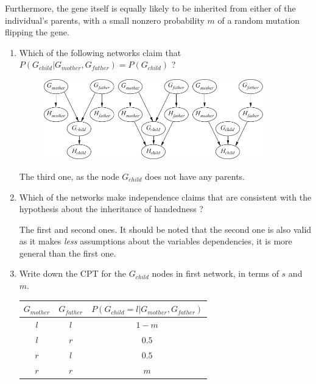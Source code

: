 \documentclass[11pt, a4paper]{article}
\begin{document}
Furthermore, the gene itself is equally likely to be inherited from either of the individual's parents, with a small nonzero probability $m$ of a random mutation flipping the gene.

\begin{enumerate}
    \item Which of the following networks claim that $P(G_{child} | G_{mother}, G_{father}) = P(G_{child})$ ?

    \begin{figure}[h]
        \centering
        \includegraphics[width=0.9\textwidth]{figures/e3_handedness.pdf}
    \end{figure}

    \begin{solution}
        The third one, as the node $G_{child}$ does not have any parents.
    \end{solution}

    \item Which of the networks make independence claims that are consistent with the hypothesis about the inheritance of handedness ?

    \begin{solution}
        The first and second ones. It should be noted that the second one is also valid as it makes \emph{less} assumptions about the variables dependencies, \ie{} it is more general than the first one.
    \end{solution}

    \item Write down the CPT for the $G_{child}$ nodes in first network, in terms of $s$ and $m$.

    \begin{solution}
        \begin{table}[h]
            \centering
            \begin{tabular}{cc|c}
                \toprule
                 $G_{mother}$ & $G_{father}$ & $P(G_{child} = l | G_{mother}, G_{father})$ \\
                 \midrule
                 $l$ & $l$ & $1 - m$ \\
                 $l$ & $r$ & $0.5$ \\
                 $r$ & $l$ & $0.5$ \\
                 $r$ & $r$ & $m$ \\
                \bottomrule
            \end{tabular}
        \end{table}
    \end{solution}


\end{enumerate}
\end{document}
